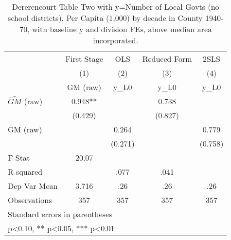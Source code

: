 \begin{table}[htbp]\centering
\def\sym#1{\ifmmode^{#1}\else\(^{#1}\)\fi}
\caption{Dererencourt Table Two with y=Number of Local Govts (no school districts), Per Capita (1,000) by decade in County 1940-70, with baseline y and division FEs, above median area incorporated.}
\begin{tabular}{l*{4}{c}}
\toprule
                    & First Stage   &         OLS   &Reduced Form   &        2SLS   \\
                    &\multicolumn{1}{c}{(1)}&\multicolumn{1}{c}{(2)}&\multicolumn{1}{c}{(3)}&\multicolumn{1}{c}{(4)}\\
                    &\multicolumn{1}{c}{GM  (raw)}&\multicolumn{1}{c}{y\_L0}&\multicolumn{1}{c}{y\_L0}&\multicolumn{1}{c}{y\_L0}\\
\midrule
$\hat{GM}$ (raw)    &       0.948** &               &       0.738   &               \\
                    &     (0.429)   &               &     (0.827)   &               \\
\addlinespace
GM  (raw)           &               &       0.264   &               &       0.779   \\
                    &               &     (0.271)   &               &     (0.758)   \\
\midrule
F-Stat              &       20.07   &               &               &               \\
R-squared           &               &        .077   &        .041   &               \\
Dep Var Mean        &       3.716   &         .26   &         .26   &         .26   \\
Observations        &         357   &         357   &         357   &         357   \\
\bottomrule
\multicolumn{5}{l}{\footnotesize Standard errors in parentheses}\\
\multicolumn{5}{l}{\footnotesize * p<0.10, ** p<0.05, *** p<0.01}\\
\end{tabular}
\end{table}
